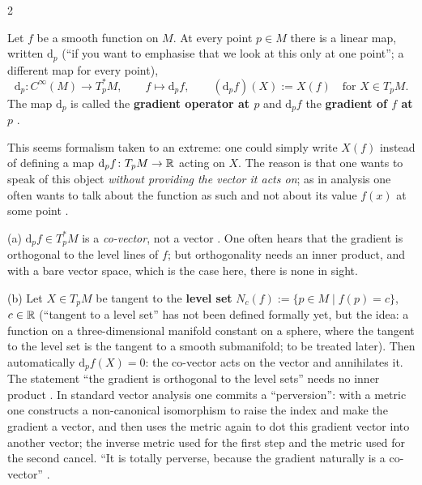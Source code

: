 \begin{paracol}{2}
\begin{definition}\label{def:tb-gradient}
Let $f$ be a smooth function on $M$. At every point $p\in M$ there is a linear map, written $\mathrm d_p$ (``if you want to emphasise that we look at this only at one point''; a different map for every point),
\[
  \mathrm d_p\colon C^\infty(M)\to T^*_pM,\qquad f\mapsto\mathrm d_pf,\qquad(\mathrm d_pf)(X):=X(f)\quad\text{for }X\in T_pM.
\]
The map $\mathrm d_p$ is called the \textbf{gradient operator at $p$} and $\mathrm d_pf$ the \textbf{gradient of $f$ at $p$}      .
\end{definition}
This seems formalism taken to an extreme: one could simply write $X(f)$ instead of defining a map $\mathrm d_pf\colon T_pM\to\mathbb{R}$ acting on $X$. The reason is that one wants to speak of this object \emph{without providing the vector it acts on}; as in analysis one often wants to talk about the function as such and not about its value $f(x)$ at some point
  .
\begin{remark}\label{rem:tb-covector}
(a) $\mathrm d_pf\in T^*_pM$ is a \emph{co-vector}, not a vector  . One often hears that the gradient is orthogonal to the level lines of $f$; but orthogonality needs an inner product, and with a bare vector space, which is the case here, there is none in sight.\par
(b) Let $X\in T_pM$ be tangent to the \textbf{level set} $N_c(f):=\{p\in M\mid f(p)=c\}$, $c\in\mathbb{R}$ (``tangent to a level set'' has not been defined formally yet, but the idea: a function on a three-dimensional manifold constant on a sphere, where the tangent to the level set is the tangent to a smooth submanifold; to be treated later). Then
automatically $\mathrm d_pf(X)=0$: the co-vector acts on the vector and annihilates it. The statement ``the gradient is orthogonal to the level sets'' needs no inner product      .
In standard vector analysis one commits a ``perversion'': with a metric one constructs a non-canonical isomorphism to raise the index and make the gradient a vector, and then uses the metric again to dot this gradient vector into another vector; the inverse metric used for the first step and the metric used for the second cancel. ``It is totally perverse,
because the gradient naturally is a co-vector''    .
\end{remark}


\end{paracol}
